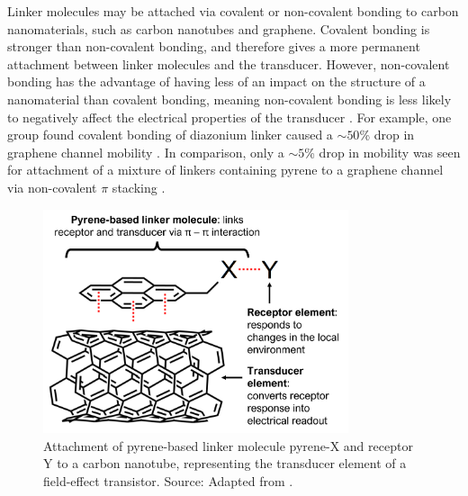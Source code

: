 \documentclass[
  a4paper,
]{scrbook}
\begin{document}
Linker molecules may be attached via covalent or non-covalent bonding to
carbon nanomaterials, such as carbon nanotubes and graphene. Covalent
bonding is stronger than non-covalent bonding, and therefore gives a
more permanent attachment between linker molecules and the transducer.
However, non-covalent bonding has the advantage of having less of an
impact on the structure of a nanomaterial than covalent bonding, meaning
non-covalent bonding is less likely to negatively affect the electrical
properties of the transducer
\autocite{Long2012,DiCrescenzo2014,Wang2020,Khan2021,Mishyn2022}. For
example, one group found covalent bonding of diazonium linker caused a
\(\sim 50\)\% drop in graphene channel mobility \autocite{Lerner2014}.
In comparison, only a \(\sim 5\)\% drop in mobility was seen for
attachment of a mixture of linkers containing pyrene to a graphene
channel via non-covalent \(\pi\) stacking \autocite{Thodkar2021}.

\begin{figure}

{\centering \includegraphics[width=0.8\textwidth,height=\textheight]{figures/ch6/pyrene-cnt.png}

}

\caption{\label{fig-pi-interaction-cnt}Attachment of pyrene-based linker
molecule pyrene-X and receptor Y to a carbon nanotube, representing the
transducer element of a field-effect transistor. Source: Adapted from
\autocite{Carbonnanotube}.}

\end{figure}
\end{document}
